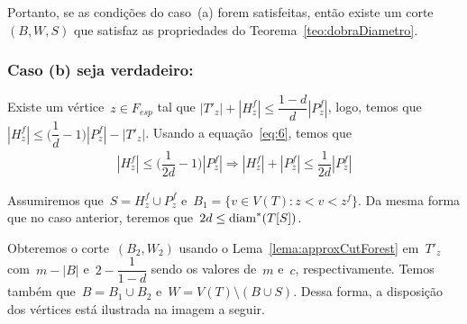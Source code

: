 		Portanto, se as condições do caso~(a) forem satisfeitas, então 
		existe um corte~$(B,W,S)$ que satisfaz as propriedades do
		Teorema~\ref{teo:dobraDiametro}.

	\bigskip
	\bigskip
	
	\subsubsection*{Caso (b) seja verdadeiro:}

	Existe um vértice~$z\in F_{esp}$ 
	tal que ${|T'_{z}|+|H_z^f|\le
	\dfrac{1-d}{d}|P_z^f|}$, logo, temos
	que~${|H^f_z|\le \Big(\dfrac{1}{d}-1\Big)|P^f_z|-|T'_z|}$.
	Usando a equação~\ref{eq:6}, temos 
	que
	\begin{align}
		|H^f_z|\le\Big(\dfrac{1}{2d}-1\Big)|P^f_z|
		\Rightarrow
		|H^f_z|+|P^f_z|\le\dfrac{1}{2d}|P^f_z| \nonumber
	\end{align}


	Assumiremos que~${S = H^f_z \cup P^f_z}$ 
	e~${B_1 = \{v\in V(T): z<v<z^f\}}$. 
	Da mesma forma que no caso anterior, teremos 
	que~${2d\le \mathrm{diam}^*(T[S])}$.

	Obteremos o corte~$(B_2,W_2)$ usando o 
	Lema~\ref{lema:approxCutForest} em~$T'_z$ 
	com~${m-|B|}$ e~${2-\dfrac{1}{1-d}}$ sendo os valores
	de~$m$ e~$c$, respectivamente. 
	Temos também que~${B = B_1 \cup B_2}$ 
	e~${W = V(T)\setminus (B\cup S)}$.
	Dessa forma, a disposição dos 
	vértices está ilustrada na imagem a seguir.

